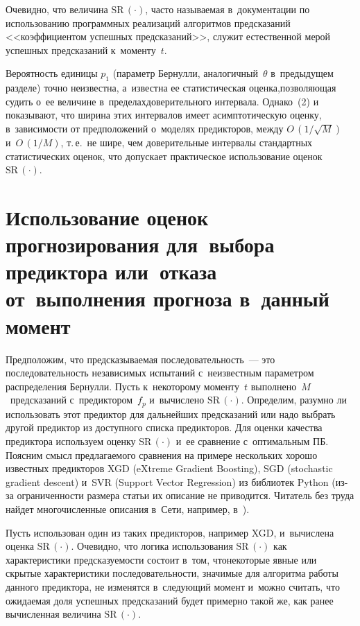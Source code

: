 \begin{multicols}{2}
  Очевидно, что величина $\mathrm{SR}\,(\cdot)$, часто на\-зы\-ва\-емая 
в~документации по использованию про\-граммных реализаций алгоритмов 
предсказаний <<коэффициентом успешных предсказаний>>, 
служит естественной мерой успешных предсказаний к~моменту~$t$.
   
   Вероятность единицы $p_1$ (параметр Бернулли, аналогичный~$\theta$ 
в~предыдущем разделе) точно не\linebreak известна, а~известна ее статистическая 
оценка,\linebreak позволяющая судить о~ее величине в~пределах\linebreak доверительного 
интервала. Однако~(2) и~\cite{5-fr} показывают, что ширина этих интервалов 
имеет асимп\-то\-ти\-че\-скую оценку, в~зависимости от предположений 
о~моделях предикторов, между $O\,(1/\sqrt{M})$ 
и~$O\,(1/M)$, т.\,е.\ не шире, чем доверительные интервалы 
стандартных статистических оценок, что допускает практическое 
использование оценок $\mathrm{SR}\,(\cdot)$.
{

}

\section{Использование оценок прогнозирования для~выбора 
предиктора или~отказа от~выполнения прогноза в~данный 
момент}

Предположим, что предсказываемая последовательность~--- это 
последовательность независимых испытаний с~неизвестным параметром 
распределения Бернулли. Пусть к~некоторому моменту~$t$ 
выполнено~$M$~предсказаний с~предиктором~$f_p$ и~вы\-чис\-ле\-но 
$\mathrm{SR}\,(\cdot)$. Определим, разумно ли использовать этот предиктор 
для дальнейших предсказаний или надо выбрать другой предиктор из 
доступного списка предикторов. Для оценки качества предиктора используем 
оценку $\mathrm{SR}\,(\cdot)$ и~ее сравнение с~оптимальным 
ПБ. Поясним смысл предлагаемого сравнения на примере нескольких 
хорошо известных предикторов XGD
(eXtreme 
Gradient Boosting), SGD
 (stochastic gradient descent) и~SVR 
 (Support Vector Regression) из библиотек Python (из-за 
ограниченности размера статьи их описание не приводится. Читатель без 
труда найдет многочисленные описания в~Сети, например, в~\cite{14-fr}). 
  
  Пусть использован один из таких предикторов, 
  например XGD, и~вы\-чис\-ле\-на оценка $\mathrm{SR}\,(\cdot)$. Оче\-видно, 
что логика использования $\mathrm{SR}\,(\cdot)$ как ха\-рактеристики 
предсказуемости со\-сто\-ит в~том, что\linebreak некоторые явные или скрытые 
характеристики по\-сле\-до\-ва\-тель\-ности, значимые для алгоритма работы 
данного предиктора, не изменятся в~сле\-ду\-ющий момент и~можно считать, 
что ожидаемая доля успешных предсказаний будет примерно такой же, как 
ранее вы\-чис\-лен\-ная величина $\mathrm{SR}\,(\cdot)$. 
  

\end{multicols}
